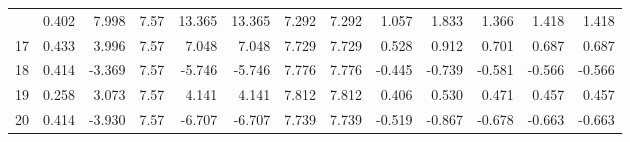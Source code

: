 \documentclass[
  letterpaper,
  DIV=11,
  numbers=noendperiod]{scrreprt}
\begin{document}
\begin{table}
{\begin{tabular}[t]{rrrrrrrrrrrrr}
\addlinespace
16 & 0.402 & 7.998 & 7.57 & 13.365 & 13.365 & 7.292 & 7.292 & 1.057 & 1.833 & 1.366 & 1.418 & 1.418\\
17 & 0.433 & 3.996 & 7.57 & 7.048 & 7.048 & 7.729 & 7.729 & 0.528 & 0.912 & 0.701 & 0.687 & 0.687\\
18 & 0.414 & -3.369 & 7.57 & -5.746 & -5.746 & 7.776 & 7.776 & -0.445 & -0.739 & -0.581 & -0.566 & -0.566\\
19 & 0.258 & 3.073 & 7.57 & 4.141 & 4.141 & 7.812 & 7.812 & 0.406 & 0.530 & 0.471 & 0.457 & 0.457\\
20 & 0.414 & -3.930 & 7.57 & -6.707 & -6.707 & 7.739 & 7.739 & -0.519 & -0.867 & -0.678 & -0.663 & -0.663\\
\bottomrule
\end{tabular}}
\end{table}
\end{document}
